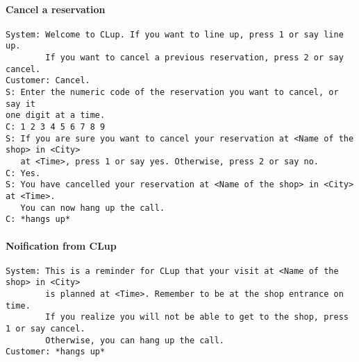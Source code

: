 \documentclass[../../main.tex]{subfiles}
\begin{document}
\paragraph{Cancel a reservation}

\begin{verbatim}
System: Welcome to CLup. If you want to line up, press 1 or say line up.
        If you want to cancel a previous reservation, press 2 or say cancel.
Customer: Cancel.
S: Enter the numeric code of the reservation you want to cancel, or say it
one digit at a time.
C: 1 2 3 4 5 6 7 8 9
S: If you are sure you want to cancel your reservation at <Name of the shop> in <City>
   at <Time>, press 1 or say yes. Otherwise, press 2 or say no.
C: Yes.
S: You have cancelled your reservation at <Name of the shop> in <City> at <Time>.
   You can now hang up the call.
C: *hangs up*
\end{verbatim}

\paragraph{Noification from CLup}

\begin{verbatim}
System: This is a reminder for CLup that your visit at <Name of the shop> in <City>
        is planned at <Time>. Remember to be at the shop entrance on time.
        If you realize you will not be able to get to the shop, press 1 or say cancel.
        Otherwise, you can hang up the call.
Customer: *hangs up*
\end{verbatim}
\end{document}
